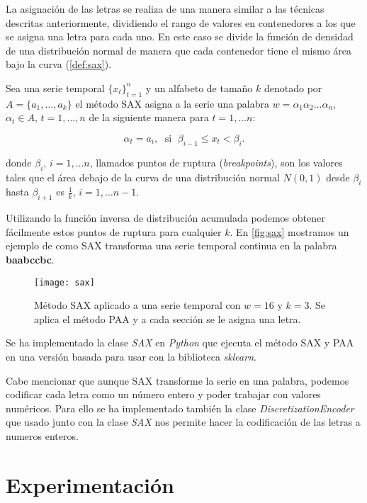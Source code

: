 La asignación de las letras se realiza de una manera similar a las técnicas descritas anteriormente, dividiendo el rango de valores en contenedores a los que se asigna una letra para cada uno. En este caso se divide la función de densidad de una distribución normal de manera que cada contenedor tiene el mismo área bajo la curva (\autoref{def:sax}).

\begin{definicion}[SAX]
  Sea una serie temporal $\{x_t\}_{t = 1}^n$ y un alfabeto de tamaño $k$ denotado por $A = \{a_1, \ldots, a_k\}$ el método SAX asigna a la serie una palabra $w = \alpha_1\alpha_2\ldots\alpha_n$, $\alpha_t \in A, \, t = 1, \ldots, n$ de la siguiente manera para $t = 1, \ldots n$:

  $$\alpha_t = a_i, \; \text{ si } \; \beta_{i-1} \leq x_t < \beta_i.$$

  donde $\beta_i$, $i = 1, \ldots n$, llamados puntos de ruptura (\emph{breakpoints}), son los valores tales que el área debajo de la curva de una distribución normal $N(0,1)$ desde $\beta_i$ hasta $\beta_{i+1}$ es $\frac{1}{k}$, $i = 1, \ldots n-1$.
  \label{def:sax}
\end{definicion}

Utilizando la función inversa de distribución acumulada podemos obtener fácilmente estos puntos de ruptura para cualquier $k$. En \autoref{fig:sax} \cite{lin2007experiencing} mostramos un ejemplo de como SAX transforma una serie temporal continua en la palabra \textbf{baabccbc}.

\begin{figure}[htpb]
  \centering
  \texttt{[image: sax]}
  \caption{Método SAX aplicado a una serie temporal con $w = 16$ y $k = 3$. Se aplica el método PAA y a cada sección se le asigna una letra.}
  \label{fig:sax}
\end{figure}

Se ha implementado la clase \emph{SAX} en \emph{Python} que ejecuta el método SAX y PAA en una versión basada para usar con la biblioteca \emph{sklearn}.

Cabe mencionar que aunque SAX transforme la serie en una palabra, podemos codificar cada letra como un número entero y poder trabajar con valores numéricos. Para ello se ha implementado también la clase \emph{DiscretizationEncoder} que usado junto con la clase \emph{SAX} nos permite hacer la codificación de las letras a numeros enteros.

\chapter{Experimentación}\label{ch:sd-experimentacion}

